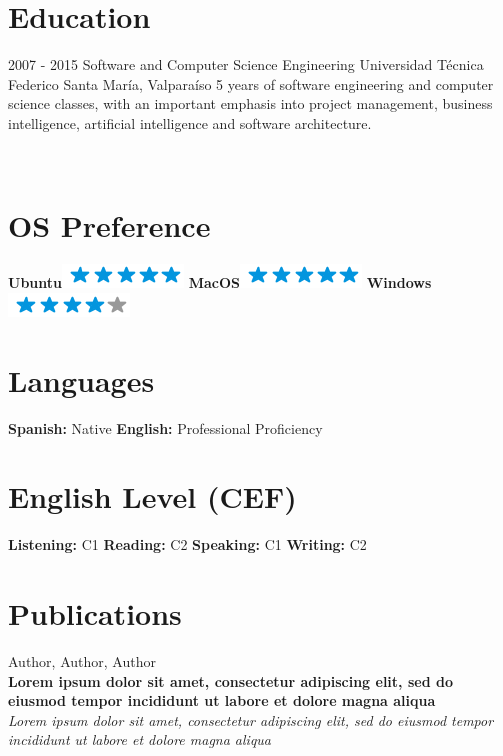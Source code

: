 \documentclass[]{friggeri-cv}
\begin{document}
\section{Education}
\begin{entrylist}
  \entry
    {2007 - 2015}
    {Software and Computer Science Engineering}
    {Universidad Técnica Federico Santa María, Valparaíso}
    {5\+ years of software engineering and computer science classes, with an important emphasis into project management, business intelligence, artificial intelligence and software architecture.\\}
\end{entrylist}

\newpage

\begin{aside}
~
~
~
  \section{OS Preference}
    \textbf{Ubuntu}\includegraphics[scale=0.40]{img/5stars.png}
    \textbf{MacOS}\includegraphics[scale=0.40]{img/5stars.png}
    \textbf{Windows}\includegraphics[scale=0.40]{img/4stars.png}
    ~
  \section{Languages}
    \textbf{Spanish:} Native
    \textbf{English:} Professional Proficiency
    ~
  \section{English Level (CEF)}
    \textbf{Listening:} C1
    \textbf{Reading:} C2
	\textbf{Speaking:} C1
	\textbf{Writing:} C2
    ~
\end{aside}

\section{Publications}
Author, Author, Author\\
\textbf{Lorem ipsum dolor sit amet, consectetur adipiscing elit, sed do eiusmod tempor incididunt ut labore et dolore magna aliqua}\\
\emph{Lorem ipsum dolor sit amet, consectetur adipiscing elit, sed do eiusmod tempor incididunt ut labore et dolore magna aliqua}
\\
\end{document}
